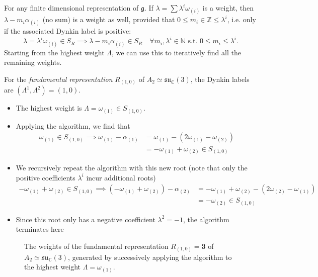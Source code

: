 \begin{description}
  For any finite dimensional representation of $\mathfrak{g}$.
  If $\lambda = \sum \lambda^{i} \omega_{(i)}$ is a weight, then $\lambda - m_i \alpha_{(i)}$ (no sum) is a weight as well, provided that $0 \leq m_i \in \mathbb{Z} \leq \lambda^{i}$, i.e. only if the associated Dynkin label is positive:
  \begin{equation}
    \boxed{\lambda = \lambda^{i} \omega_{(i)} \in S_R \implies \lambda - m_i \alpha_{(i)} \in S_R \quad \forall m_i, \lambda^{i} \in \mathbb{N} \text{ s.t. } 0 \leq m_i \leq \lambda^{i}.}
  \end{equation}
  Starting from the highest weight $\Lambda$, we can use this to iteratively find all the remaining weights.
\end{description}

\begin{example}[]
  For the \emph{fundamental representation} $R_{(1, 0)}$ of $A_2 \simeq \mathfrak{su}_{\mathbb{C}}(3)$, the Dynkin labels are $(\Lambda^1, \Lambda^2) = (1, 0)$.
  \begin{itemize}
    \item The highest weight is $\Lambda = \omega_{(1)} \in S_{(1, 0)}.$
    \item Applying the algorithm, we find that
    \begin{align}
      \omega_{(1)} \in S_{(1, 0)} \implies \omega_{(1)} - \alpha_{(1)} &= \omega_{(1)} - (2 \omega_{(1)} - \omega_{(2)}) \\
			     &= - \omega_{(1)} + \omega_{(2)} \in S_{(1, 0)}
    \end{align}
  \item We recursively repeat the algorithm with this new root (note that only the positive coefficients $\lambda^{i}$ incur additional roots)
    \begin{align}
      -\omega_{(1)} + \omega_{(2)} \in S_{(1, 0)} \implies (-\omega_{(1)} + \omega_{(2)})  - \alpha_{(2)} &= -\omega_{(1)} + \omega_{(2)} - (2 \omega_{(2)} - \omega_{(1)}) \\
						   &= -\omega_{(2)} \in S_{(1, 0)}
    \end{align}
  \item Since this root only has a negative coefficient $\lambda^{2} = -1$, the algorithm terminates here
  \end{itemize}
\end{example} 

\begin{figure}[tbhp]
  \centering
  \def\svgwidth{0.4\columnwidth}
  
  \caption{The weights of the fundamental representation $R_{(1, 0)} = \boldsymbol 3$ of $A_2 \simeq \mathfrak{su}_{\mathbb{C}}(3)$, generated by successively applying the algorithm to the highest weight $\Lambda = \omega_{(1)}$.}
  \label{fig:l22f2}
\end{figure}
